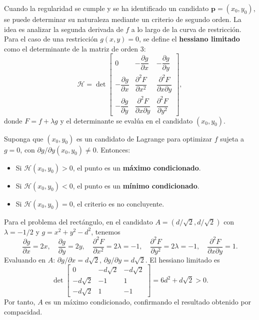 Cuando la regularidad se cumple y se ha identificado un candidato $\mathbf{p}=(x_0,y_0)$, se puede determinar su naturaleza mediante un criterio de segundo orden. La idea es analizar la segunda derivada de $f$ a lo largo de la curva de restricción. Para el caso de una restricción $g(x,y)=0$, se define el \textbf{hessiano limitado} como el determinante de la matriz de orden $3$:
\[
\mathcal{H} =
\det\begin{bmatrix}
0 & -\dfrac{\partial g}{\partial x} & -\dfrac{\partial g}{\partial y} \\[8pt]
-\dfrac{\partial g}{\partial x} & \dfrac{\partial^2 F}{\partial x^2} & \dfrac{\partial^2 F}{\partial x\partial y} \\[8pt]
-\dfrac{\partial g}{\partial y} & \dfrac{\partial^2 F}{\partial x\partial y} & \dfrac{\partial^2 F}{\partial y^2}
\end{bmatrix},
\]
donde $F=f+\lambda g$ y el determinante se evalúa en el candidato $(x_0,y_0)$.

\begin{theorem}
Suponga que $(x_0,y_0)$ es un candidato de Lagrange para optimizar $f$ sujeta a $g=0$, con $\partial g/\partial y(x_0,y_0)\neq0$. Entonces:
\begin{itemize}
    \item Si $\mathcal{H}(x_0,y_0)>0$, el punto es un \textbf{máximo condicionado}.
    \item Si $\mathcal{H}(x_0,y_0)<0$, el punto es un \textbf{mínimo condicionado}.
    \item Si $\mathcal{H}(x_0,y_0)=0$, el criterio es no concluyente.
\end{itemize}
\end{theorem}

\begin{example}
Para el problema del rectángulo, en el candidato $A=(d/\sqrt2,d/\sqrt2)$ con $\lambda=-1/2$ y $g=x^2+y^2-d^2$, tenemos
\[
\frac{\partial g}{\partial x}=2x,\quad \frac{\partial g}{\partial y}=2y,\quad
\frac{\partial^2 F}{\partial x^2}=2\lambda=-1,\quad
\frac{\partial^2 F}{\partial y^2}=2\lambda=-1,\quad
\frac{\partial^2 F}{\partial x\partial y}=1.
\]
Evaluando en $A$: $\partial g/\partial x=d\sqrt2$, $\partial g/\partial y=d\sqrt2$. El hessiano limitado es
\[
\det\begin{bmatrix}
0 & -d\sqrt2 & -d\sqrt2 \\
-d\sqrt2 & -1 & 1 \\
-d\sqrt2 & 1 & -1
\end{bmatrix}
= 6d^2+d\sqrt2 >0.
\]
Por tanto, $A$ es un máximo condicionado, confirmando el resultado obtenido por compacidad.
\end{example}

